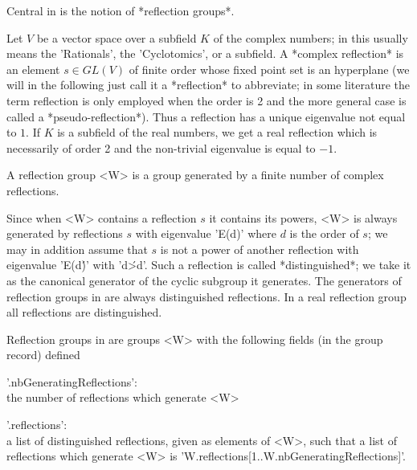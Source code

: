

Central  in {\CHEVIE}  is the  notion of  *reflection groups*.

Let  $V$ be a vector  space over a subfield  $K$ of the complex numbers; in
{\GAP}  this  usually  means  the  'Rationals',  the  'Cyclotomics',  or  a
subfield. A *complex reflection* is an element $s\in GL(V)$ of finite order
whose  fixed point set is an hyperplane (we will in the following just call
it  a *reflection* to abbreviate; in some literature the term reflection is
only  employed when the  order is 2  and the more  general case is called a
*pseudo-reflection*).  Thus a reflection has  a unique eigenvalue not equal
to  $1$. If $K$ is a subfield of the real numbers, we get a real reflection
which  is necessarily of order 2 and the non-trivial eigenvalue is equal to
$-1$.

A  reflection group <W> is a group  generated by a finite number of complex
reflections.

Since  when <W> contains  a reflection $s$  it contains its  powers, <W> is
always generated by reflections $s$ with eigenvalue 'E(d)' where $d$ is the
order  of $s$; we may in addition assume that $s$ is not a power of another
reflection  with  eigenvalue  'E(d\')'  with  'd\'>d'. Such a reflection is
called *distinguished*; we take it as the canonical generator of the cyclic
subgroup it generates. The generators of reflection groups in {\CHEVIE} are
always   distinguished  reflections.   In  a   real  reflection  group  all
reflections are distinguished.

Reflection groups in {\CHEVIE} are groups <W> with the following fields (in
the group record) defined

'.nbGeneratingReflections':\\ the number of reflections which generate
         <W>

'.reflections':\\ a list of distinguished reflections, given as elements of
  <W>, such that a list of reflections which generate <W> is
  'W.reflections{[1..W.nbGeneratingReflections]}'.

